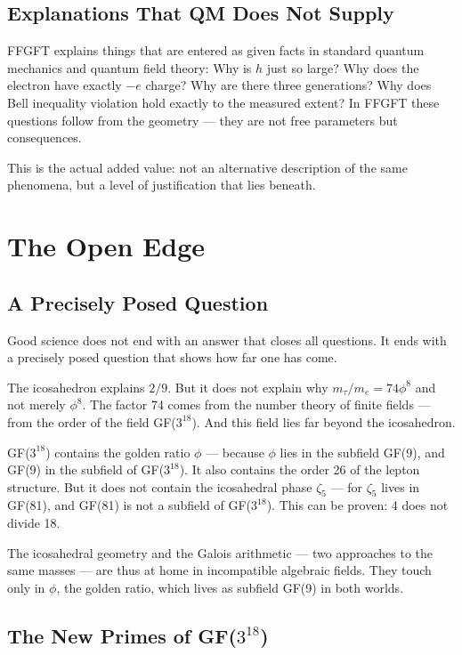 \documentclass[12pt,oneside]{book}
\begin{document}
\section{Explanations That QM Does Not Supply}

FFGFT explains things that are entered as given facts in standard quantum mechanics and quantum field theory: Why is $h$ just so large? Why does the electron have exactly $-e$ charge? Why are there three generations? Why does Bell inequality violation hold exactly to the measured extent? In FFGFT these questions follow from the geometry --- they are not free parameters but consequences.

This is the actual added value: not an alternative description of the same phenomena, but a level of justification that lies beneath.

\chapter{The Open Edge}

\section{A Precisely Posed Question}

Good science does not end with an answer that closes all questions. It ends with a precisely posed question that shows how far one has come.

The icosa\-hedron explains $2/9$. But it does not explain why $m_\tau/m_e = 74 \phi^8$ and not merely $\phi^8$. The factor 74 comes from the number theory of finite fields --- from the order of the field GF($3^{18}$). And this field lies far beyond the icosa\-hedron.

GF($3^{18}$) contains the golden ratio $\phi$ --- because $\phi$ lies in the subfield GF(9), and GF(9) in the subfield of GF($3^{18}$). It also contains the order 26 of the lepton structure. But it does not contain the icosahedral phase $\zeta_5$ --- for $\zeta_5$ lives in GF(81), and GF(81) is not a subfield of GF($3^{18}$). This can be proven: 4 does not divide 18.

The icosahedral geometry and the Galois arithmetic --- two approaches to the same masses --- are thus at home in incompatible algebraic fields. They touch only in $\phi$, the golden ratio, which lives as subfield GF(9) in both worlds.

\section{The New Primes of GF($3^{18}$)}
\end{document}
